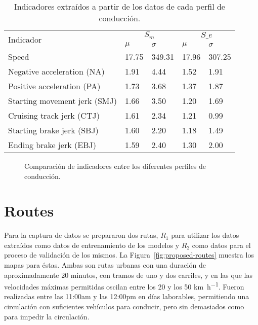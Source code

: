 {\begin{table}
	\caption[Indicadores de los datos extraídos de cada perfil]{Indicadores extraídos a partir de los datos de cada perfil de conducción.}
	\label{tbl:raw-indicators-from-drivers-profiles}
	\begin{tabular}{@{}lllll@{}}
		\toprule
		\multirow{2}{*}{Indicador} & \multicolumn{2}{c}{$S_m$} & \multicolumn{2}{c}{$S\_e$} \\
		& $\mu$ & $\sigma$ & $\mu$ & $\sigma$ \\ \midrule
		Speed & 17.75 & 349.31 & 17.96 & 307.25 \\
		Negative acceleration (NA) & 1.91 & 4.44 & 1.52 & 1.91 \\
		Positive acceleration (PA) & 1.73 & 3.68 & 1.37 & 1.87 \\
		Starting movement jerk (SMJ) & 1.66 & 3.50 & 1.20 & 1.69 \\
		Cruising track jerk (CTJ) & 1.61 & 2.34 & 1.21 & 0.99 \\
		Starting brake jerk (SBJ) & 1.60 & 2.20 & 1.18 & 1.49 \\
		Ending brake jerk (EBJ) & 1.59 & 2.40 & 1.30 & 2.00 \\
		\bottomrule
	\end{tabular}
\end{table}

\begin{figure}
	\centering
	\qquad
	\caption{Comparación de indicadores entre los diferentes perfiles de conducción.}
	\label{fig:raw-indicators-from-drivers-profiles}
\end{figure}

\section{Routes}

Para la captura de datos se prepararon dos rutas, $R_1$ para utilizar los datos extraídos como datos de entrenamiento de los modelos y $R_2$ como datos para el proceso de validación de los mismos. La Figura~\ref{fig:proposed-routes} muestra los mapas para éstas. Ambas son rutas urbanas con una duración de aproximadamente 20 minutos, con tramos de uno y dos carriles, y en las que las velocidades máximas permitidas oscilan entre los 20 y los 50 \si{\kilo\metre\per\hour}. Fueron realizadas entre las 11:00am y las 12:00pm en días laborables, permitiendo una circulación con suficientes vehículos para conducir, pero sin demasiados como para impedir la circulación.

}
